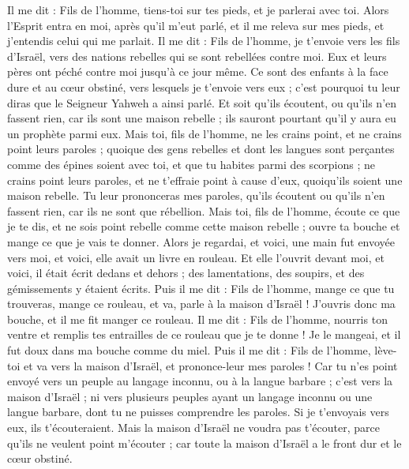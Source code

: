 \begin{multicols}{2}
\VerseOne{}Il me dit : Fils de l'homme, tiens-toi sur tes pieds, et je parlerai avec toi.
Alors l'Esprit entra en moi, après qu'il m'eut parlé, et il me releva sur mes pieds, et j'entendis celui qui me parlait.
Il me dit : Fils de l'homme, je t'envoie vers les fils d'Israël, vers des nations rebelles qui se sont rebellées contre moi. Eux et leurs pères ont péché contre moi jusqu'à ce jour même.
Ce sont des enfants à la face dure et au cœur obstiné, vers lesquels je t'envoie vers eux ; c'est pourquoi tu leur diras que le Seigneur Yahweh a ainsi parlé.
Et soit qu'ils écoutent, ou qu'ils n'en fassent rien, car ils sont une maison rebelle ; ils sauront pourtant qu'il y aura eu un prophète parmi eux.
Mais toi, fils de l'homme, ne les crains point, et ne crains point leurs paroles ; quoique des gens rebelles et dont les langues sont perçantes comme des épines soient avec toi, et que tu habites parmi des scorpions ; ne crains point leurs paroles, et ne t'effraie point à cause d'eux, quoiqu'ils soient une maison rebelle.
Tu leur prononceras mes paroles, qu'ils écoutent ou qu'ils n'en fassent rien, car ils ne sont que rébellion.
Mais toi, fils de l'homme, écoute ce que je te dis, et ne sois point rebelle comme cette maison rebelle ; ouvre ta bouche et mange ce que je vais te donner.
Alors je regardai, et voici, une main fut envoyée vers moi, et voici, elle avait un livre en rouleau.
Et elle l'ouvrit devant moi, et voici, il était écrit dedans et dehors ; des lamentations, des soupirs, et des gémissements y étaient écrits.
\VerseOne{}Puis il me dit : Fils de l'homme, mange ce que tu trouveras, mange ce rouleau, et va, parle à la maison d'Israël !
J'ouvris donc ma bouche, et il me fit manger ce rouleau.
Il me dit : Fils de l'homme, nourris ton ventre et remplis tes entrailles de ce rouleau que je te donne ! Je le mangeai, et il fut doux dans ma bouche comme du miel.
Puis il me dit : Fils de l'homme, lève-toi et va vers la maison d'Israël, et prononce-leur mes paroles !
Car tu n'es point envoyé vers un peuple au langage inconnu, ou à la langue barbare ; c'est vers la maison d'Israël ;
ni vers plusieurs peuples ayant un langage inconnu ou une langue barbare, dont tu ne puisses comprendre les paroles. Si je t'envoyais vers eux, ils t'écouteraient.
Mais la maison d'Israël ne voudra pas t'écouter, parce qu'ils ne veulent point m'écouter ; car toute la maison d'Israël a le front dur et le cœur obstiné.

\end{multicols}
